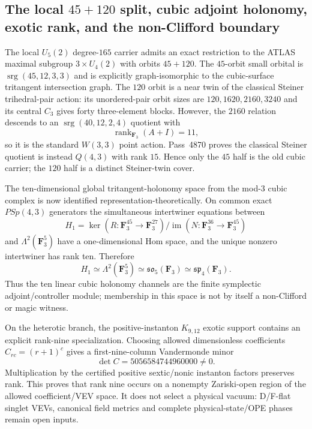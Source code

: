 \subsection{The local $45+120$ split, cubic adjoint holonomy, exotic rank, and the non-Clifford boundary}
\label{sec:20260916-fivefront-intertwiner-magic}

The local $U_5(2)$ degree-$165$ carrier admits an exact restriction to the ATLAS maximal subgroup $3\times U_4(2)$ with orbits $45+120$.  The $45$-orbit small orbital is $\operatorname{srg}(45,12,3,3)$ and is explicitly graph-isomorphic to the cubic-surface tritangent intersection graph.  The $120$ orbit is a near twin of the classical Steiner trihedral-pair action: its unordered-pair orbit sizes are $120,1620,2160,3240$ and its central $C_3$ gives forty three-element blocks.  However, the $2160$ relation descends to an $\operatorname{srg}(40,12,2,4)$ quotient with
\[
 \operatorname{rank}_{\mathbf F_3}(A+I)=11,
\]
so it is the standard $W(3,3)$ point action.  Pass~4870 proves the classical Steiner quotient is instead $Q(4,3)$ with rank $15$.  Hence only the $45$ half is the old cubic carrier; the $120$ half is a distinct Steiner-twin cover.

The ten-dimensional global tritangent-holonomy space from the mod-$3$ cubic complex is now identified representation-theoretically.  On common exact $PSp(4,3)$ generators the simultaneous intertwiner equations between
\[
 H_1=\ker(R:\mathbf F_3^{45}\to\mathbf F_3^{27})/\operatorname{im}(N:\mathbf F_3^{36}\to\mathbf F_3^{45})
\]
and $\Lambda^2(\mathbf F_3^5)$ have a one-dimensional Hom space, and the unique nonzero intertwiner has rank ten.  Therefore
\[
 \boxed{H_1\simeq\Lambda^2(\mathbf F_3^5)\simeq\mathfrak{so}_5(\mathbf F_3)\simeq\mathfrak{sp}_4(\mathbf F_3).}
\]
Thus the ten linear cubic holonomy channels are the finite symplectic adjoint/controller module; membership in this space is not by itself a non-Clifford or magic witness.

On the heterotic branch, the positive-instanton $K_{9,12}$ exotic support contains an explicit rank-nine specialization.  Choosing allowed dimensionless coefficients $C_{rc}=(r+1)^c$ gives a first-nine-column Vandermonde minor
\[
 \det C=5056584744960000\ne0.
\]
Multiplication by the certified positive sextic/nonic instanton factors preserves rank.  This proves that rank nine occurs on a nonempty Zariski-open region of the allowed coefficient/VEV space.  It does not select a physical vacuum: D/F-flat singlet VEVs, canonical field metrics and complete physical-state/OPE phases remain open inputs.


